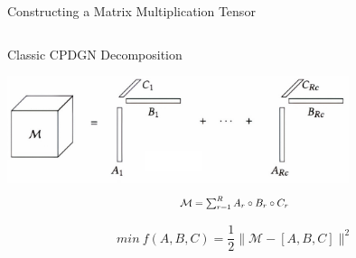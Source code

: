 \documentclass[final,hyperref={pdfpagelabels=false}]{beamer}
\begin{document}
\begin{frame}[t]
\begin{columns}[t]
\begin{column}{.5\linewidth}
\begin{block}{Constructing a Matrix Multiplication Tensor}
\begin{columns}
\begin{column}{.5\textwidth}
                \end{column}
            \end{columns}
        \end{block}

        \begin{block}{Classic CPDGN Decomposition}
            \begin{center}
                \includegraphics[scale=0.1, width=0.75\textwidth]{Dali2_ml_resize_x2.jpg}
                \begin{equation*}
                    \resizebox{0.25\textwidth}{!}{$
                    \small{\mathcal{M} = \sum_{r=1}^R A_r \circ B_r \circ C_r}$}
                \end{equation*}
            \end{center}
            
            \begin{equation*}
                min \ f(A, B, C) = \frac{1}{2}\|\mathcal{M} - [A, B, C]\|^2
            \end{equation*}
            \vspace*{2em}


\end{block}
\end{column}
\end{columns}
\end{frame}
\end{document}
